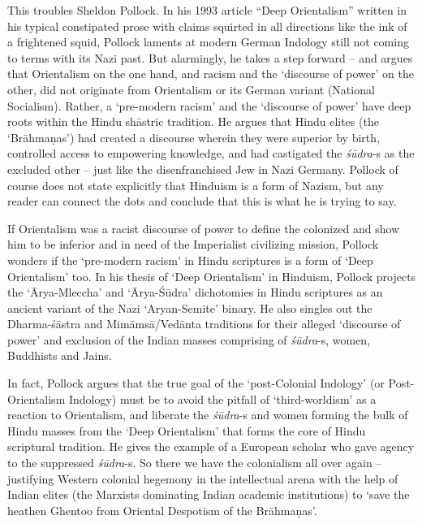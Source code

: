 This troubles Sheldon Pollock. In his 1993 article “Deep Orientalism” written in his typical constipated prose with claims squirted in all directions like the ink of a frightened squid, Pollock laments at modern German Indology still not coming to terms with its Nazi past. But alarmingly, he takes a step forward – and argues that Orientalism on the one hand, and racism and the ‘discourse of power’ on the other, did not originate from Orientalism or its German variant (National Socialism). Rather, a ‘pre-modern racism’ and the ‘discourse of power’ have deep roots within the Hindu shāstric tradition. He argues that Hindu elites (the ‘Brāhmaṇas’) had created a discourse wherein they were superior by birth, controlled access to empowering knowledge, and had castigated the \textit{śūdra}-s as the excluded other – just like the disenfranchised Jew in Nazi Germany. Pollock of course does not state explicitly that Hinduism is a form of Nazism, but any reader can connect the dots and conclude that this is what he is trying to say.

If Orientalism was a racist discourse of power to define the colonized and show him to be inferior and in need of the Imperialist civilizing mission, Pollock wonders if the ‘pre-modern racism’ in Hindu scriptures is a form of ‘Deep Orientalism’ too. In his thesis of ‘Deep Orientalism’ in Hinduism, Pollock projects the ‘Ārya-Mleccha’ and ‘Ārya-Śūdra’ dichotomies in Hindu scriptures as an ancient variant of the Nazi ‘Aryan-Semite’ binary. He also singles out the Dharma-śāstra and Mimāmsā/Vedānta traditions for their alleged ‘discourse of power’ and exclusion of the Indian masses comprising of \textit{śūdra}-s, women, Buddhists and Jains.

In fact, Pollock argues that the true goal of the ‘post-Colonial Indology’ (or Post-Orientalism Indology) must be to avoid the pitfall of ‘third-worldism’ as a reaction to Orientalism, and liberate the \textit{śūdra}-s and women forming the bulk of Hindu masses from the ‘Deep Orientalism’ that forms the core of Hindu scriptural tradition. He gives the example of a European scholar who gave agency to the suppressed \textit{śūdra}-s. So there we have the colonialism all over again – justifying Western colonial hegemony in the intellectual arena with the help of Indian elites (the Marxists dominating Indian academic institutions) to ‘save the heathen Ghentoo from Oriental Despotism of the Brāhmaṇas’.

\vspace{-.3cm}

